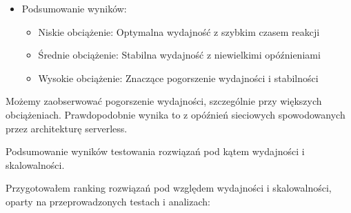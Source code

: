 \documentclass[runningheads,12pt]{llncs}
\begin{document}
\begin{itemize}
  \item Podsumowanie wyników:
  \begin{itemize}
    \item Niskie obciążenie: Optymalna wydajność z szybkim czasem reakcji
    \item Średnie obciążenie: Stabilna wydajność z niewielkimi opóźnieniami
    \item Wysokie obciążenie: Znaczące pogorszenie wydajności i stabilności
  \end{itemize}
\end{itemize}

Możemy zaobserwować pogorszenie wydajności, szczególnie przy większych obciążeniach. Prawdopodobnie wynika to z opóźnień sieciowych spowodowanych przez architekturę serverless.

\newpage


Podsumowanie wyników testowania rozwiązań pod kątem wydajności i skalowalności.

Przygotowałem ranking rozwiązań pod względem wydajności i skalowalności, oparty na przeprowadzonych testach i analizach:
\end{document}
